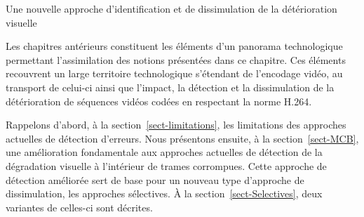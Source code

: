 \documentclass[letterpaper, twoside, 12pt,memoire]{thETS}
\newcommand{\sect}[1]{section~\ref{#1}}
\begin{document}
\begin{chapter}{Une nouvelle approche d'identification et de dissimulation de la
détérioration visuelle}

Les chapitres antérieurs constituent les éléments d'un panorama technologique
permettant l'assimilation des notions présentées dans ce chapitre. Ces éléments
recouvrent un large territoire technologique s'étendant de l'encodage vidéo, au
transport de celui-ci ainsi que l'impact, la détection et la dissimulation
de la détérioration de séquences vidéos codées en respectant la norme H.264.

Rappelons d'abord, à la \sect{sect-limitations}, les limitations des
approches actuelles de détection d'erreurs. Nous présentons ensuite, à la
\sect{sect-MCB}, une amélioration fondamentale aux approches actuelles de
détection de la dégradation visuelle à l'intérieur de trames corrompues.
Cette approche de détection améliorée sert de base pour un nouveau type d'approche de dissimulation,
les approches sélectives. À la \sect{sect-Selectives}, deux variantes de
celles-ci sont décrites.


\end{chapter}
\end{document}

